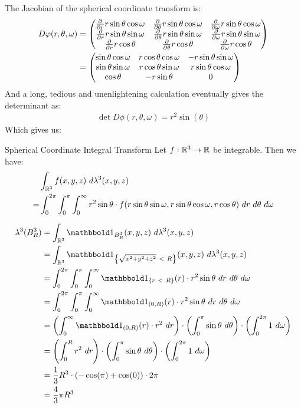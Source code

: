 The Jacobian of the spherical coordinate transform is:
\begin{align*}
	D\varphi(r, \theta, \omega)
	&=
	\begin{pmatrix}
		\pdv{r} r \sin \theta \cos \omega & \pdv{\theta} r \sin \theta \cos \omega & \pdv{\omega} r \sin \theta \cos \omega\\
		\pdv{r} r \sin \theta \sin \omega & \pdv{\theta} r \sin \theta \sin \omega & \pdv{\omega} r \sin \theta \sin \omega\\
		\pdv{r} r \cos \theta & \pdv{\theta} r \cos \theta &  \pdv{\omega} r \cos \theta
	\end{pmatrix}\\
	&=
	\begin{pmatrix}
		\sin \theta \cos \omega & r \cos \theta \cos \omega & -r \sin \theta \sin \omega\\
		\sin \theta \sin \omega & r \cos \theta \sin \omega & r \sin \theta \cos \omega\\
		\cos \theta & -r \sin \theta & 0
	\end{pmatrix}
\end{align*}
And a long, tedious and unenlightening calculation eventually gives the determinant as:
\begin{align*}
	\det D\phi(r, \theta, \omega) = r^2 \sin(\theta)
\end{align*}
Which gives us:
\begin{importantcorollary}{Spherical Coordinate Integral Transform}{}
	Let $f : \mathbb{R}^3 \to \mathbb{R}$ be integrable. Then we have:
	\begin{align*}
		&\int_{\mathbb{R}^3} f(x,y,z) ~d\lambda^3(x,y,z)\\ 
		= &\int_{0}^{2\pi} \int_{0}^\pi \int_{0}^{\infty} r^2 \sin \theta \cdot f(r\sin \theta \sin \omega, r\sin \theta \cos \omega, r \cos \theta)~dr ~d\theta ~d\omega
	\end{align*}
\end{importantcorollary}
\begin{example}
	\begin{align*}
		\lambda^3(B^3_R)
		&=
		\int_{\bR^3} \boldone_{{B^3_R}}(x,y,z) ~d\lambda^3(x,y,z)\\
		&=
		\int_{\bR^3} \boldone_{\lr{\sqrt{x^2 + y^2 + z^2}~ <~ R}}(x,y,z) ~d\lambda^3(x,y,z)\\
		&=
		\int_0^{2\pi} \int_0^\pi \int_0^\infty \boldone_{\lr{r~ <~ R}}(r) \cdot r^2 \sin \theta ~dr ~d\theta ~d\omega\\
		&=
		\int_0^{2\pi} \int_0^\pi \int_0^\infty \boldone_{(0,R)}(r) \cdot r^2 \sin \theta ~dr ~d\theta ~d\omega\\
		&= \lr(\int_0^\infty \boldone_{(0,R)}(r) \cdot r^2 ~dr) \cdot \lr(\int_0^\pi \sin \theta ~d\theta) \cdot \lr(\int_0^{2\pi} 1 ~d\omega)\\
		&= \lr(\int_0^R r^2 ~dr) \cdot \lr(\int_0^\pi \sin \theta ~d\theta) \cdot \lr(\int_0^{2\pi} 1 ~d\omega)\\
		&= \frac{1}{3} R^3 \cdot (-\cos(\pi) + \cos(0)) \cdot 2\pi\\
		&= \frac{4}{3} \pi R^3
	\end{align*}
\end{example}
